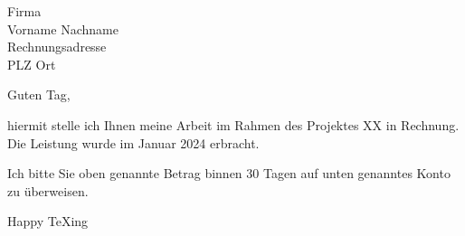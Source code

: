 \documentclass[parskip=half-,ngerman]{scrartcl}
\begin{document}
\begin{letter}{Firma\\Vorname Nachname\\Rechnungsadresse\\PLZ Ort}
	
\opening{Guten Tag,}

hiermit stelle ich Ihnen meine Arbeit im Rahmen des Projektes XX in Rechnung. Die Leistung wurde im Januar 2024 erbracht. 


\PrintInvoiceTabular

Ich bitte Sie oben genannte Betrag binnen 30 Tagen auf unten genanntes Konto zu überweisen.

\closing{Happy \TeX{}ing}

	
\end{letter}
\end{document}
